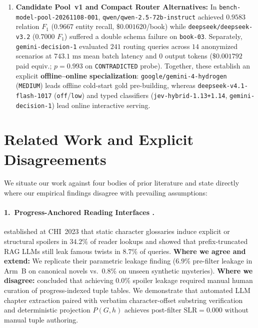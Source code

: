 \documentclass[11pt,twocolumn]{article}
\begin{document}
\begin{enumerate}
  \item \textbf{Candidate Pool~v1 and Compact Router Alternatives:} In \texttt{bench-model-pool-20261108-001}, \texttt{qwen/qwen-2.5-72b-instruct} achieved $0.9583$ relation $F_1$ ($0.9667$ entity recall, $\$0.001620$/book) while \texttt{deepseek/deepseek-v3.2} ($0.7000$ $F_1$) suffered a double schema failure on \texttt{book-03}. Separately, \texttt{gemini-decision-1} evaluated $241$ routing queries across $14$ anonymized scenarios at $743.1\text{ ms}$ mean batch latency and $0$ output tokens ($\$0.001792$ paid equiv.; $p=0.993$ on \texttt{CONTRADICTED} probe). Together, these establish an explicit \textbf{offline--online specialization}: \texttt{google/gemini-4-hydrogen} (\texttt{MEDIUM}) leads offline cold-start gold pre-building, whereas \texttt{deepseek-v4.1-flash-1017} (\texttt{off}/\texttt{low}) and typed classifiers (\texttt{jev-hybrid-1.13+1.14}, \texttt{gemini-decision-1}) lead online interactive serving.
\end{enumerate}

\section{Related Work and Explicit Disagreements}
\label{sec:related_work}

We situate our work against four bodies of prior literature and state directly where our empirical findings disagree with prevailing assumptions:

\paragraph{1.\ Progress-Anchored Reading Interfaces \citep{boyd2023spoiler}.}
\citet{boyd2023spoiler} established at CHI~2023 that static character glossaries induce explicit or structural spoilers in $34.2\%$ of reader lookups and showed that prefix-truncated RAG LLMs still leak famous twists in $8.7\%$ of queries. \textbf{Where we agree and extend:} We replicate their parametric leakage finding ($6.9\%$ pre-filter leakage in Arm~B on canonical novels vs.\ $0.8\%$ on unseen synthetic mysteries). \textbf{Where we disagree:} \citet{boyd2023spoiler} concluded that achieving $0.0\%$ spoiler leakage required manual human curation of progress-indexed tuple tables. We demonstrate that automated LLM chapter extraction paired with verbatim character-offset substring verification and deterministic projection $P(G, h)$ achieves post-filter $\text{SLR} = 0.000$ without manual tuple authoring.
\end{document}

